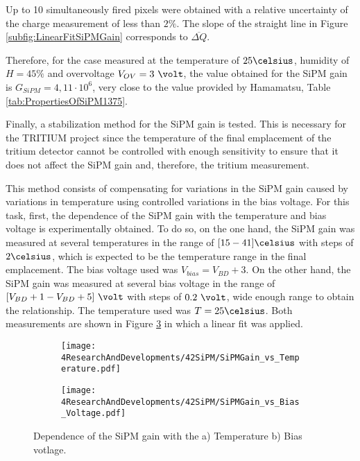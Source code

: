 
Up to 10 simultaneously fired pixels were obtained with a relative uncertainty of the charge measurement of less than $2\%$. The slope of the straight line in Figure \ref{subfig:LinearFitSiPMGain} corresponds to $\overline{\Delta Q}$.

Therefore, for the case measured at the temperature of $25\celsius$, humidity of $H=45\%$ and overvoltage $V_{OV}=3~\volt$, the value obtained for the SiPM gain is $G_{SiPM}=4,11\cdot{} 10^{6}$, very close to the value provided by Hamamatsu, Table \ref{tab:PropertiesOfSiPM1375}.

Finally, a stabilization method for the SiPM gain is tested. This is necessary for the TRITIUM project since the temperature of the final emplacement of the tritium detector cannot be controlled with enough sensitivity to ensure that it does not affect the SiPM gain and, therefore, the tritium measurement. 

This method consists of compensating for variations in the SiPM gain caused by variations in temperature using controlled variations in the bias voltage. For this task, first, the dependence of the SiPM gain with the temperature and bias voltage is experimentally obtained. To do so, on the one hand, the SiPM gain was measured at several temperatures in the range of $[15-41]\celsius$ with steps of $2\celsius$, which is expected to be the temperature range in the final emplacement. The bias voltage used was $V_{bias} = V_{BD}+3$. On the other hand, the SiPM gain was measured at several bias voltage in the range of $[V_{BD}+1-V_{BD}+5]~\volt$ with steps of $0.2~\volt$, wide enough range to obtain the relationship. The temperature used was $T=25\celsius$. Both measurements are shown in Figure \ref{fig:SiPMGainDependance} in which a linear fit was applied. 

\begin{figure}
\centering
    \begin{subfigure}[b]{0.47\textwidth}
    \centering
    \texttt{[image: 4ResearchAndDevelopments/42SiPM/SiPMGain\_vs\_Temperature.pdf]}  
    \caption{\label{subfig:SiPMGainvsTemperature}}
    \end{subfigure}
    \hfill
    \begin{subfigure}[b]{0.47\textwidth}
    \centering
    \texttt{[image: 4ResearchAndDevelopments/42SiPM/SiPMGain\_vs\_Bias\_Voltage.pdf]}  
    \caption{\label{subfig:SiPMGainvsBiasVoltage}}
    \end{subfigure}
 \caption{Dependence of the SiPM gain with the a) Temperature b) Bias votlage.}
 \label{fig:SiPMGainDependance}
\end{figure}

